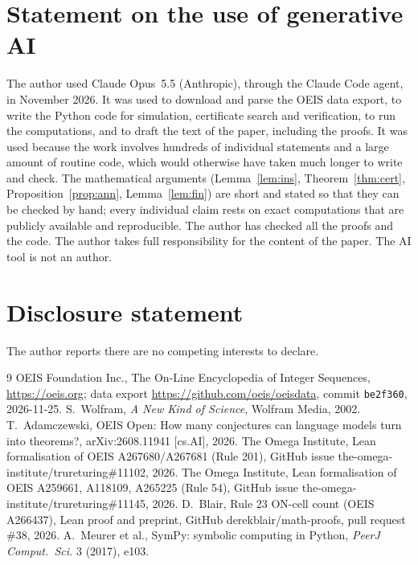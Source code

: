 \documentclass[11pt]{article}
\theoremstyle{definition}
\theoremstyle{remark}
\begin{document}
\section*{Statement on the use of generative AI}
The author used Claude Opus~5.5 (Anthropic), through the Claude Code agent, in November 2026. It was used to download and parse the OEIS data export, to write the Python code for simulation, certificate search and verification, to run the computations, and to draft the text of the paper, including the proofs. It was used because the work involves hundreds of individual statements and a large amount of routine code, which would otherwise have taken much longer to write and check. The mathematical arguments (Lemma~\ref{lem:ins}, Theorem~\ref{thm:cert}, Proposition~\ref{prop:ann}, Lemma~\ref{lem:fin}) are short and stated so that they can be checked by hand; every individual claim rests on exact computations that are publicly available and reproducible. The author has checked all the proofs and the code. The author takes full responsibility for the content of the paper. The AI tool is not an author.

\section*{Disclosure statement}
The author reports there are no competing interests to declare.

\begin{thebibliography}{9}
 OEIS Foundation Inc., The On-Line Encyclopedia of Integer Sequences, \url{https://oeis.org}; data export \url{https://github.com/oeis/oeisdata}, commit \texttt{be2f360}, 2026-11-25.
 S.~Wolfram, \emph{A New Kind of Science}, Wolfram Media, 2002.
 T.~Adamczewski, OEIS Open: How many conjectures can language models turn into theorems?, arXiv:2608.11941 [cs.AI], 2026.
 The Omega Institute, Lean formalisation of OEIS A267680/A267681 (Rule 201), GitHub issue the-omega-institute/trureturing\#11102, 2026.
 The Omega Institute, Lean formalisation of OEIS A259661, A118109, A265225 (Rule 54), GitHub issue the-omega-institute/trureturing\#11145, 2026.
 D.~Blair, Rule 23 ON-cell count (OEIS A266437), Lean proof and preprint, GitHub derekblair/math-proofs, pull request \#38, 2026.
 A.~Meurer et al., SymPy: symbolic computing in Python, \emph{PeerJ Comput.\ Sci.} 3 (2017), e103.
\end{thebibliography}
\end{document}
